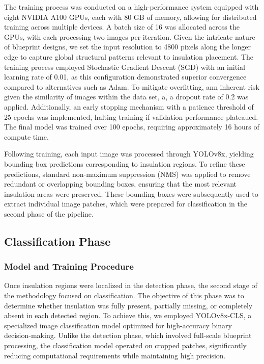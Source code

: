 \documentclass[]{IEEEphot}
\begin{document}
The training process was conducted on a high-performance system equipped with eight NVIDIA A100 GPUs, each with 80 GB of memory, allowing for distributed training across multiple devices. A batch size of 16 was allocated across the GPUs, with each processing two images per iteration. Given the intricate nature of blueprint designs, we set the input resolution to 4800 pixels along the longer edge to capture global structural patterns relevant to insulation placement. The training process employed Stochastic Gradient Descent (SGD) with an initial learning rate of 0.01, as this configuration demonstrated superior convergence compared to alternatives such as Adam. To mitigate overfitting, ann inherent risk given the similarity of images within the data set, a, a dropout rate of 0.2 was applied. Additionally, an early stopping mechanism with a patience threshold of 25 epochs was implemented, halting training if validation performance plateaued. The final model was trained over 100 epochs, requiring approximately 16 hours of compute time.

Following training, each input image was processed through YOLOv8x, yielding bounding box predictions corresponding to insulation regions. To refine these predictions, standard non-maximum suppression (NMS) was applied to remove redundant or overlapping bounding boxes, ensuring that the most relevant insulation areas were preserved. These bounding boxes were subsequently used to extract individual image patches, which were prepared for classification in the second phase of the pipeline.

\subsection{Classification Phase}
\subsubsection{Model and Training Procedure
}
\hspace*{1em}Once insulation regions were localized in the detection phase, the second stage of the methodology focused on classification. The objective of this phase was to determine whether insulation was fully present, partially missing, or completely absent in each detected region. To achieve this, we employed YOLOv8x-CLS, a specialized image classification model optimized for high-accuracy binary decision-making. Unlike the detection phase, which involved full-scale blueprint processing, the classification model operated on cropped patches, significantly reducing computational requirements while maintaining high precision.
\end{document}
